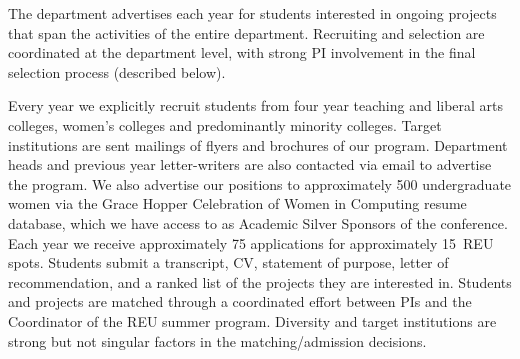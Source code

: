 \documentclass[11pt]{article}
\begin{document}
The department
advertises each year for students interested in ongoing projects that
span the activities of the entire department.
Recruiting and selection are coordinated at the department level, with
strong PI involvement in the final selection process (described below).

Every year we explicitly recruit students from four year teaching
and liberal arts colleges, women's colleges and predominantly minority
colleges. Target institutions are sent mailings of flyers and brochures
of our program. Department heads and previous year letter-writers are
also contacted via email to advertise the program.
We also advertise our positions to approximately 500 undergraduate
women via the Grace Hopper Celebration of Women in Computing resume database,
which we have access to as Academic Silver Sponsors of the conference.
Each year we receive approximately 75 applications for approximately
15~REU spots.  Students submit a transcript, CV, statement of purpose,
letter of recommendation, and a ranked list of the projects they are
interested in. Students and projects are matched through a coordinated
effort between PIs and the Coordinator of the REU summer program.
Diversity and target institutions are strong but not singular factors
in the matching/admission decisions.



\end{document}
